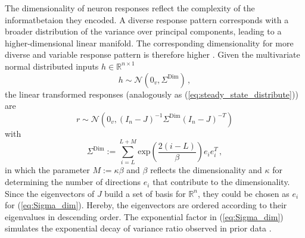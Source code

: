 \documentclass[11pt]{article}
\begin{document}
	The dimensionality of neuron responses reflect the complexity of the informatbetaion they encoded. %
	A diverse response pattern corresponds with a broader distribution of the variance over principal components, leading to a higher-dimensional linear manifold. %
	The corresponding dimensionality for more diverse and variable response pattern is therefore higher \cite{tragenap2023nature}. %
	Given the multivariate normal distributed inputs $h \in \mathbb{R}^{n \times 1}$
		\begin{equation} \label{eq:input_distribution_dimensionality}
			h \sim \mathcal{N}(0_v, \Sigma^{\text{Dim}}) \, ,
		\end{equation}
	the linear transformed responses (analogously as (\ref{eq:steady_state_distribute})) are
		\begin{equation} \label{eq:response_distribution_dimensionality}
			r \sim \mathcal{N}(0_v, (I_n - J)^{-1} \Sigma^{\text{Dim}} (I_n - J)^{-T})
		\end{equation}
	with 
		\begin{equation} \label{eq:Sigma_dim}
			\Sigma^{\text{Dim}} := \sum_{i=L}^{L+M} \text{exp}\left(\frac{2(i-L)}{\beta}\right) e_i e_i^T \, , 
		\end{equation}
	in which the parameter $M := \kappa \beta$ and $\beta$ reflects the dimensionality \cite{tragenap2023nature} and $\kappa$ for determining the number of directions $e_i$ that contribute to the dimensionality. Since the eigenvectors of $J$ build a set of basis for $\mathbb{R}^n$, they could be chosen as $e_i$ for (\ref{eq:Sigma_dim}). Hereby, the eigenvectors are ordered according to their eigenvalues in descending order. The exponential factor in (\ref{eq:Sigma_dim}) simulates the exponential decay of variance ratio observed in prior data \cite{tragenap2023nature}. 
	
\end{document}

